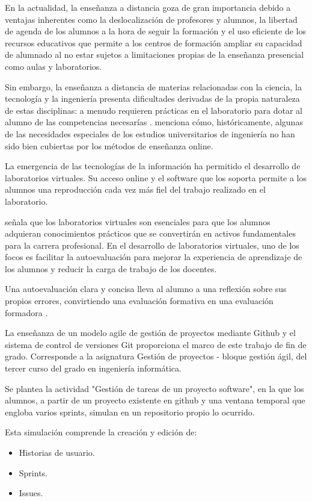 
En la actualidad, la enseñanza a distancia goza de gran importancia debido a ventajas inherentes como la deslocalización de profesores y alumnos, la libertad de agenda de los alumnos a la hora de seguir la formación y el uso eficiente de los recursos educativos que permite a los centros de formación ampliar su capacidad de alumnado al no estar sujetos a limitaciones propias de la enseñanza presencial como aulas y laboratorios.

Sin embargo, la enseñanza a distancia de materias relacionadas con la ciencia, la tecnología y  la ingeniería  presenta dificultades derivadas de la propia naturaleza de estas disciplinas: a menudo requieren prácticas en el laboratorio para dotar al alumno de las competencias necesarías . \cite{bourne2019} menciona  cómo, históricamente, algunas de las necesidades especiales de los estudios universitarios de ingeniería no han sido bien cubiertas por los métodos de enseñanza online.

La emergencia de las tecnologías de la información ha permitido el desarrollo de laboratorios virtuales. Su acceso online y el software que los soporta permite a los alumnos una reproducción cada vez más fiel del trabajo realizado en el laboratorio.

\cite{tejado2018}  señala que los laboratorios virtuales son esenciales para que los alumnos adquieran conocimientos prácticos que se convertirán en  activos fundamentales para la  carrera profesional. En el desarrollo de laboratorios virtuales, uno de los focos es facilitar la autoevaluación para mejorar la experiencia de aprendizaje de los alumnos y reducir la carga de trabajo de los docentes.

Una autoevaluación clara y concisa lleva al alumno a una reflexión sobre sus propios errores, convirtiendo una evaluación formativa en una evaluación formadora \cite{sánchez2009}.

La enseñanza de un modelo agile de gestión de proyectos mediante Github y el sistema de control de versiones Git proporciona el marco de este trabajo de fin de grado. Corresponde a la asignatura Gestión de proyectos - bloque gestión ágil, del tercer curso del grado en ingeniería informática.

Se plantea la actividad "Gestión de tareas de un proyecto software", en la que los alumnos, a partir de un proyecto existente en github y una ventana temporal que engloba varios sprints, simulan en un repositorio propio lo ocurrido.

Esta simulación comprende la creación y edición de:

\begin{itemize}
	\item Historias de usuario.
	\item Sprints.
	\item Issues.
\end{itemize}



 